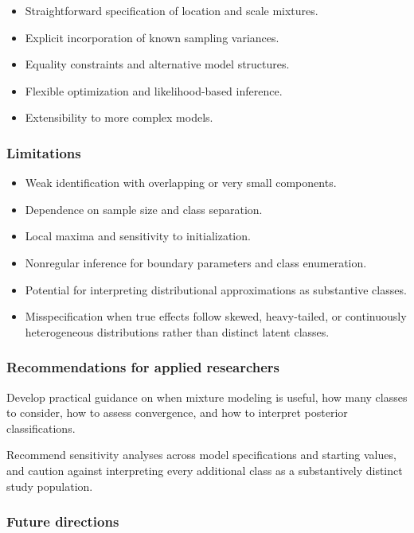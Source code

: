 \documentclass[
  english,
  man, noextraspace,floatsintext]{apa6}
\begin{document}
\begin{itemize}
\item
  Straightforward specification of location and scale mixtures.
\item
  Explicit incorporation of known sampling variances.
\item
  Equality constraints and alternative model structures.
\item
  Flexible optimization and likelihood-based inference.
\item
  Extensibility to more complex models.
\end{itemize}

\subsubsection{Limitations}\label{limitations}

\begin{itemize}
\item
  Weak identification with overlapping or very small components.
\item
  Dependence on sample size and class separation.
\item
  Local maxima and sensitivity to initialization.
\item
  Nonregular inference for boundary parameters and class enumeration.
\item
  Potential for interpreting distributional approximations as substantive classes.
\item
  Misspecification when true effects follow skewed, heavy-tailed, or continuously heterogeneous distributions rather than distinct latent classes.
\end{itemize}

\subsubsection{Recommendations for applied researchers}\label{recommendations-for-applied-researchers}

Develop practical guidance on when mixture modeling is useful, how many classes to consider, how to assess convergence, and how to interpret posterior classifications.

Recommend sensitivity analyses across model specifications and starting values, and caution against interpreting every additional class as a substantively distinct study population.

\subsubsection{Future directions}\label{future-directions}
\end{document}
